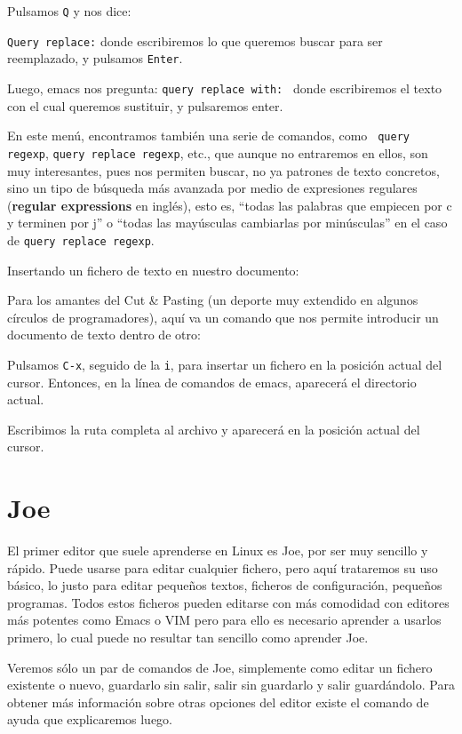 Pulsamos {\tt Q} y nos dice:

{\tt Query  replace:} donde escribiremos  lo que queremos  buscar para
ser reemplazado, y pulsamos {\tt Enter}.

Luego,  emacs  nos   pregunta:  {\tt  query  replace   with:  }  donde
escribiremos el  texto con  el cual  queremos sustituir,  y pulsaremos
enter.

En este  menú, encontramos  también una serie  de comandos,  como {\tt
query  regexp},  {\tt  query  replace regexp},  etc.,  que  aunque  no
entraremos en ellos,  son muy interesantes, pues  nos permiten buscar,
no  ya patrones  de  texto concretos,  sino un  tipo  de búsqueda  más
avanzada por medio de expresiones regulares ({\bf regular expressions}
en  inglés), esto  es,  ``todas  las palabras  que  empiecen  por c  y
terminen por j'' o ``todas  las mayúsculas cambiarlas por minúsculas''
en el caso de {\tt query replace regexp}.

Insertando un fichero de texto en nuestro documento:

Para  los amantes  del Cut  \& Pasting  (un deporte  muy extendido  en
algunos círculos de programadores), aquí va un comando que nos permite
introducir un documento de texto dentro de otro:

Pulsamos {\tt C-x}, seguido de la {\tt i}, para insertar un fichero en
la posición  actual del cursor. Entonces,  en la línea de  comandos de
emacs, aparecerá el directorio actual.

Escribimos  la ruta  completa al  archivo y  aparecerá en  la posición
actual del cursor.

\section{Joe}


El primer editor  que suele aprenderse en Linux es  {\sf Joe}, por ser
muy sencillo  y rápido.  Puede usarse  para editar  cualquier fichero,
pero  aquí trataremos  su uso  básico, lo  justo para  editar pequeños
textos,  ficheros de  configuración, pequeños  programas. Todos  estos
ficheros pueden editarse  con más comodidad con  editores más potentes
como {\sf  Emacs} o {\sf VIM}  pero para ello es  necesario aprender a
usarlos primero, lo cual puede  no resultar tan sencillo como aprender
{\sf Joe}.

Veremos sólo un par de comandos  de {\sf Joe}, simplemente como editar
un fichero existente o nuevo, guardarlo sin salir, salir sin guardarlo
y salir guardándolo. Para obtener más información sobre otras opciones
del editor existe el comando de ayuda que explicaremos luego.

